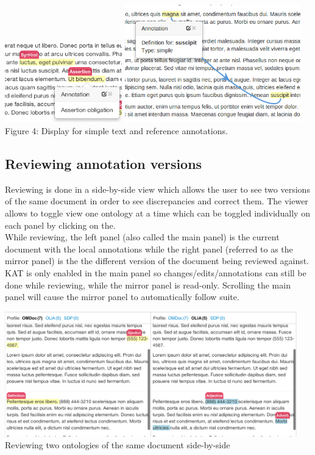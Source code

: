 \documentclass[a4paper, 12pt, notitlepage]{report}
\begin{document}
\begin{center}
\includegraphics[width=2in]{suscipit.png} \includegraphics[width=3in]{definition.png}\\
\tiny{Figure 4: Display for simple text and reference annotations.}
\end{center}

\subsection{Reviewing annotation versions}
Reviewing is done in a side-by-side view which allows the user to see two versions of the same document in order to see discrepancies and correct them. The viewer allows to toggle view one ontology at a time which can be toggled individually on each panel by clicking on the. \\
While reviewing, the left panel (also called the main panel) is the current document with the local annotations while the right panel (referred to as the mirror panel) is the the different version of the document being reviewed against. \\
KAT is only enabled in the main panel so changes/edits/annotations can still be done while reviewing, while the mirror panel is read-only. Scrolling the main panel will cause the mirror panel to automatically follow suite.

\begin{center}
 \includegraphics[width=5in]{review.png}\\
 \tiny{Reviewing two ontologies of the same document side-by-side}
\end{center}
\end{document}
